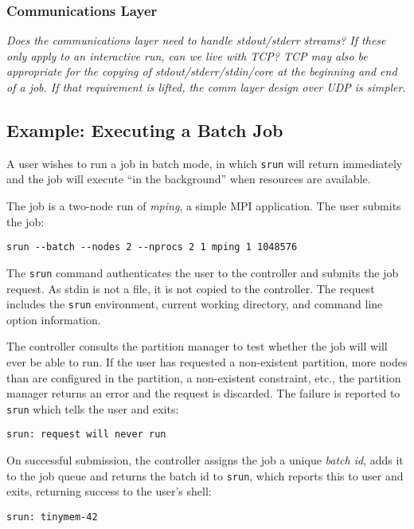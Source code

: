 \subsubsection{Communications Layer}

{\em Does the communications layer need to handle stdout/stderr streams?
If these only apply to an interactive run, can we live with TCP?
TCP may also be appropriate for the copying of stdout/stderr/stdin/core
at the beginning and end of a job.  If that requirement is lifted,
the comm layer design over UDP is simpler.}

\subsection{Example:  Executing a Batch Job}

A user wishes to run a job in batch mode, in which {\tt srun} will return 
immediately and the job will execute ``in the background'' when resources
are available.

The job is a two-node run of {\em mping}, a simple MPI application.
The user submits the job:
\begin{verbatim}
srun --batch --nodes 2 --nprocs 2 1 mping 1 1048576
\end{verbatim}

The {\tt srun} command authenticates the user to the controller and submits
the job request.  As stdin is not a file, it is not copied to the controller.
The request includes the {\tt srun} environment, current working directory, 
and command line option information.

The controller consults the partition manager to test whether the job will
will ever be able to run.  If the user has requested a non-existent partition,
more nodes than are configured in the partition, a non-existent constraint, 
etc., the partition manager returns an error and the request is discarded.
The failure is reported to {\tt srun} which tells the user and exits:
\begin{verbatim}
srun: request will never run
\end{verbatim}

On successful submission, the controller assigns the job a unique 
{\em batch id}, adds it to the job queue and returns the 
batch id to {\tt srun}, which reports this to user and exits, returning
success to the user's shell:

\begin{verbatim}
srun: tinymem-42
\end{verbatim}

